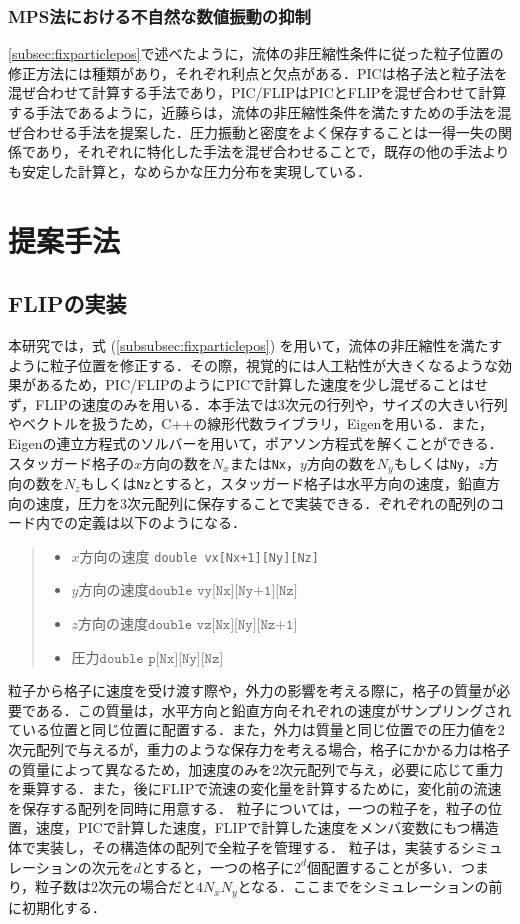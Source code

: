 \documentclass[a4j,12pt]{jreport}
\begin{document}
\subsection{MPS法における不自然な数値振動の抑制}\label{subsec:japan}
\ref{subsec:fixparticlepos}で述べたように，流体の非圧縮性条件に従った粒子位置の修正方法には種類があり，それぞれ利点と欠点がある．PICは格子法と粒子法を混ぜ合わせて計算する手法であり，PIC/FLIPはPICとFLIPを混ぜ合わせて計算する手法であるように，近藤らは，流体の非圧縮性条件を満たすための手法を混ぜ合わせる手法\cite{kondou}を提案した．圧力振動と密度をよく保存することは一得一失の関係であり，それぞれに特化した手法を混ぜ合わせることで，既存の他の手法よりも安定した計算と，なめらかな圧力分布を実現している．

\chapter{提案手法} \label{chapter:4}
\section{FLIPの実装} \label{sec:ImpFLIP}
本研究では，式 (\ref{subsubsec:fixparticlepos}) を用いて，流体の非圧縮性を満たすように粒子位置を修正する．その際，視覚的には人工粘性が大きくなるような効果があるため，PIC/FLIPのようにPICで計算した速度を少し混ぜることはせず，FLIPの速度のみを用いる．本手法では3次元の行列や，サイズの大きい行列やベクトルを扱うため，C++の線形代数ライブラリ，Eigenを用いる．また，Eigenの連立方程式のソルバーを用いて，ポアソン方程式を解くことができる．
スタッガード格子の$x$方向の数を$N_x$または\texttt{Nx}，$y$方向の数を$N_y$もしくは\texttt{Ny}，$z$方向の数を$N_z$もしくは\texttt{Nz}とすると，スタッガード格子は水平方向の速度，鉛直方向の速度，圧力を3次元配列に保存することで実装できる．ぞれぞれの配列のコード内での定義は以下のようになる．
\begin{quote}
	\begin{itemize}
		\item $x$方向の速度 \texttt{double vx[Nx+1][Ny][Nz]} 
		\item $y方向の速度 \texttt{double vy[Nx][Ny+1][Nz]}$ 
		\item $z方向の速度 \texttt{double vz[Nx][Ny][Nz+1]}$ 
		\item $圧力 \texttt{double p[Nx][Ny][Nz]}$
	\end{itemize}
\end{quote}
粒子から格子に速度を受け渡す際や，外力の影響を考える際に，格子の質量が必要である．この質量は，水平方向と鉛直方向それぞれの速度がサンプリングされている位置と同じ位置に配置する．また，外力は質量と同じ位置での圧力値を2次元配列で与えるが，重力のような保存力を考える場合，格子にかかる力は格子の質量によって異なるため，加速度のみを2次元配列で与え，必要に応じて重力を乗算する．また，後にFLIPで流速の変化量を計算するために，変化前の流速を保存する配列を同時に用意する．
粒子については，一つの粒子を，粒子の位置，速度，PICで計算した速度，FLIPで計算した速度をメンバ変数にもつ構造体で実装し，その構造体の配列で全粒子を管理する．
粒子は，実装するシミュレーションの次元を$d$とすると，一つの格子に$2^d$個配置することが多い．つまり，粒子数は2次元の場合だと$4N_xN_y$となる．ここまでをシミュレーションの前に初期化する．
\end{document}
